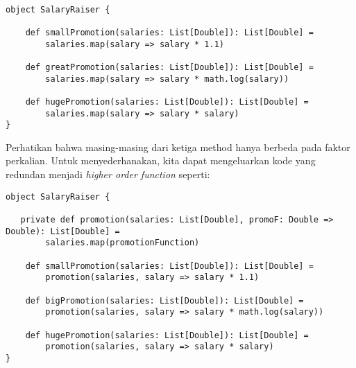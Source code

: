 \begin{verbatim}

object SalaryRaiser {

    def smallPromotion(salaries: List[Double]): List[Double] =
        salaries.map(salary => salary * 1.1)

  	def greatPromotion(salaries: List[Double]): List[Double] =
        salaries.map(salary => salary * math.log(salary))

  	def hugePromotion(salaries: List[Double]): List[Double] =
        salaries.map(salary => salary * salary)
}
\end{verbatim}

Perhatikan bahwa masing-masing dari ketiga method hanya berbeda pada faktor perkalian. Untuk menyederhanakan, kita dapat mengeluarkan kode yang redundan menjadi \textit{higher order function} seperti:

\begin{verbatim}
object SalaryRaiser {

   private def promotion(salaries: List[Double], promoF: Double => Double): List[Double] =
        salaries.map(promotionFunction)  

  	def smallPromotion(salaries: List[Double]): List[Double] =
        promotion(salaries, salary => salary * 1.1)

  	def bigPromotion(salaries: List[Double]): List[Double] =
        promotion(salaries, salary => salary * math.log(salary))

  	def hugePromotion(salaries: List[Double]): List[Double] =
        promotion(salaries, salary => salary * salary)
}
\end{verbatim}





